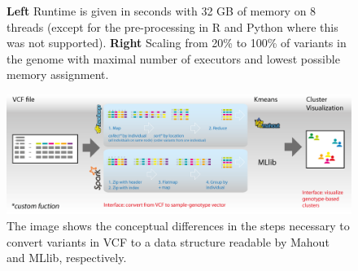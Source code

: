 \documentclass{bmcart}
\begin{document}
\begin{backmatter}
\begin{figure}[h!]
  \caption{
      {\bf Left} Runtime is given in seconds with 32 GB of memory on 8 threads (except for the pre-processing in R and Python where this was not supported). 
      {\bf Right} Scaling from 20\% to 100\% of variants in the genome with maximal number of executors and lowest possible memory assignment.}
      \end{figure}

%
\begin{figure}[h!]
\includegraphics[type=pdf,ext=.pdf,read=.pdf, scale=0.25]{signature}
  \caption{ The image shows the conceptual differences in the steps necessary to convert variants in VCF to a data structure readable by Mahout and MLlib, respectively.}
      \end{figure}


\end{backmatter}
\end{document}
